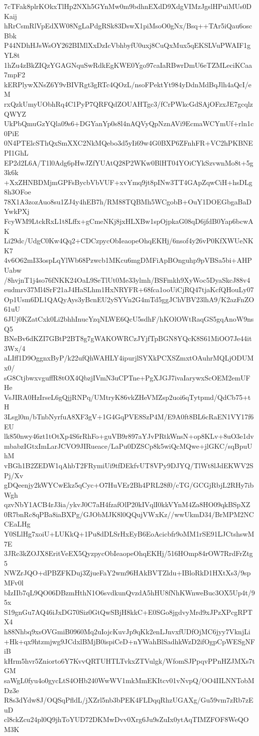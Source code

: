 7cTFak8plrKOkxTlHp2NXh5GYnMw0m9bdhnEXdD9XdgVIMzJgslHPuiMUs0DKaij
hRrCsmRlVpEdXW08NgLaPdgRSk83DswX1piMsoO0gNx/Bsq++TAr5iQau6oscBbk
P44NDhHJsWsOY262BIMlXxDzIcVbhbyfU0uxj8CuQxMux5qEKSLVuPWAIF1gYL8t
1hZu4zBkZIQzYGAGNquSwRdkEgKWE0Ygo97caIaRBwrDmU6eTZMLeciKCaa7mpF2
kERPlywXNsZ6Y9vBIVRgt3gRTc4QOzL/nsoFPektYt984yDdnMdBqJlh4aQcI/eM
rxQzkUmyUObhRq4C1PyP7QRFQdZOUAHTgc3/fCrPWkcGdSAjOFzxJE7gcqlzQWYZ
UkPbQmuGzYQla09s6+DGYanYp0s8l4nAQVyQpNznAVi9EcmaWCYmUf+rln1c0PiE
0N4PTElcSThQxSmXXC2NkMQebo3d5yIi69w4G0BXP6ZFnhFR+VC2hPKBNEPI1GhL
EP2d2L6A/T1l0Adg6pHwJZfYUAtQ28P2WKw0BlHT04YOiCYkSzvwnMo8t+5g3k6k
+XxZHNBDMjmGPFsBycbVbVUF+xvYmq9jt8pINw3TT4GApZqwCiH+hsDLg8h3OFoe
78X1A3zozAuo8su1ZJ4y4hEB7h/RM88TQBMh5WCgobB+OuY1DOEGbgaBaDYwkPXj
FcyWM9LtckRxL1t8Lffx+gCmeNKj8jxHLXBw1spOjpkaG08qD6jfdB0Yap6bcwAK
Li29dc/UdgC0Kw4Qq2+CDCzpycObIeaopeOhqEKHj/6nsof4y26vP0KfXWUeNKK7
4v6O62mI33ospLqYlWb68Pzwcb1MKcu6mgDMFiApBOnguhp9pVBSa5bi+AHPUabw
/8hvjnT1j4so76fNKK24OaL9SeTlUt0Me33ylmh/BSFmkh9XyWoc5DyaSkcJ88v4
eudmrv37Ml4SrF21aJ4HaSLhm1HxNRYFR+68fca1ooUiCjRQ47tjaKcfQHouLy07
Op1Usm6DL1QAQyAys3yBcnEU2ySYVn2G4mTd5ggJChVBV23lhA9/K2azFnZO61uU
6JUj0KZatCxk0Li2bhhInucYzqNLWE6QcU5sdhF/hKOlOWtRaqGS5gqAnoW9nsQ5
BNeBv6dKZI7GBtP2BT8g7gWAKOWRCzJYjfTpBGN8YQcK8S61MiOO7Je44it3Wx/4
aLIff1D9OggnxByP/k22ufQhWAHLY4ipurjlSYXkPCXSZmxtOAuhrMQLjODUMx0/
sG8CtjbwxvguffR8tOX4QbzjIVmN3uCPTne+PgXJGJ7ivaIarywxScOEM2emUFHe
VsJIRA0HzIrseL6gQjjRNPq/UMtryK86vkZHeVMZsp2uoi6qTytpmd/QdCb75+tH
3Lsgl0m/bTnbNyrfuA8XF3gV+1G4GqPVE8SzP4M/E9A0ft8BL6cRaEN1VY17f6EU
lk850nwy46zt1tOtXp4S6rRhFo+guVB9r897aYJvPRtkWnsN+op8KLv+8uO3e1dv
mbabzIGtxImLarJCVO9JIRueace/LaPu0DZSCp8k5wiQcMQwe+jlGKC/sqBpuUhM
vBGh1B2ZEDW1qAhbT2FRymiUi9tfDEkfvUT8VPy9DJYQ/TlWt8lJdEKWV2SPj/Xv
gDQeenjy2kWYCwEkz5qCyc+O7HuVEr2Bh4PRL28f0/cTG/GCGjRbjL2RHy7ibWgh
qzvNbY1ACB4rJ3ia/ykvJ0C7aH4fzafOlP20kIVqlI0kkVYnM4Za8HO09qkBSpXZ
0R7bnRc8qPBa8iaBXPg/GJObMJK8l0QQujVWxKz//wwUkmD34/BrMPM2NCCEaLHg
Y0SLlHg7xoiU+LUKkQ+1Pu8dDLSrHxEyB6EoAcicbfr9oMM1rSE91LJCtshswM7E
3JRc3kZOJX8EritVeEX5QyzpycObIeaopeOhqEKHj/516HOmp84rOW7RrdFrZtg5
NWZrJQO+dPBZFKDuj3ZjueFaY2wm96HAkBVTZldu+IBloRkD1HXtXs3/9spMFv0l
bIzIIb7qL9QO06DBzmHthN1O6svdkunQvzdA5hHU8fNhKWnweBuc3OX5Up4t/95x
S19gnGu7AQ46iJxDG70Siz0GtQwSBjH8kkC+E0SGo8jgdvyMrd9xJPzXPcgRPTX4
h88Nhbq9xsOVGmiB0960Mq2uIojcKuvJp9qKk2enLJnvxfUDfOjMC6jyy7VknjLi
+Hk+qx9htzmjwg9JCdxlBMjB0ispiCeD+nYWahBlSadhkWzD2ifOgpCpWESgNFiB
kHrm5hvr5Zniorto6Y7KvvQRTUHTLTvkxZTVulgk/WfomSJPpqvPPnHZJMXs7tGM
saWgL0fyu4o0gycLtS4OHb240WwWV1mkMmEKItcv01vNvpQ/OO4IILNNTobMDz3e
R8s3dYdw8J/OQSqPfldL/jXZrl5nb3bPEK4FLDqqRhzUGAXg/Gu59vm7zRb7zEuD
cl8ckZcu24pl0Q9jhToYUD72DKMwDvv0Xrg6Ju9sZuIx0ytAqTIMZFOF8WeQOM3K
